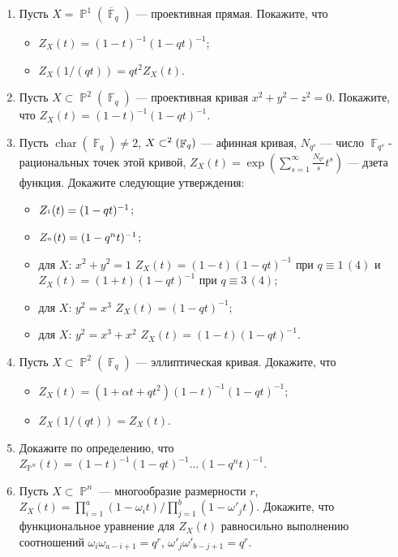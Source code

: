 \documentclass[a4paper, 12pt]{article}
\DeclareMathOperator{\PP}{\mathbb{P}}
\let\AA\relax
\DeclareMathOperator{\AA}{\mathbb{A}}
\DeclareMathOperator{\FF}{\mathbb{F}}
\DeclareMathOperator{\chr}{char}
\begin{document}
\begin{enumerate}[noitemsep,topsep=0pt]
    \item Пусть $X=\PP^1(\overline{\FF}_q)$ --- проективная прямая. Покажите, что
    \begin{itemize}[noitemsep,topsep=0pt]
        \item $Z_X(t)=(1-t)^{-1}(1-qt)^{-1}$;
        \item $Z_X(1/(qt))=qt^2 Z_X(t)$.
    \end{itemize} %
    \item Пусть $X\subset\PP^2(\FF_q)$ --- проективная кривая $x^2+y^2-z^2=0$. Покажите, что $Z_X(t)=(1-t)^{-1}(1-qt)^{-1}$. %
    \item Пусть $\chr(\FF_q)\neq 2$, $X\subset\AA^2(\FF_q)$ --- афинная кривая, $N_{q^s}$ --- число $\FF_{q^s}$- рациональных точек этой кривой, $Z_X(t)=\exp\left(\sum_{s=1}^\infty \frac{N_{q^s}}{s} t^s\right)$ --- дзета функция. Докажите следующие утверждения:
    \begin{itemize}[noitemsep,topsep=0pt]
        \item $Z_{\AA^1}(t)=(1-qt)^{-1}$;
        \item $Z_{\AA^n}(t)=(1-q^nt)^{-1}$;
        \item для $X$: $x^2+y^2=1$ $Z_X(t)=(1-t)(1-qt)^{-1}$ при $q\equiv 1\, (4)$ и $Z_X(t)=(1+t)(1-qt)^{-1}$ при $q\equiv 3\, (4)$;
        \item для $X$: $y^2=x^3$ $Z_X(t)=(1-qt)^{-1}$;
        \item для $X$: $y^2=x^3+x^2$ $Z_X(t)=(1-t)(1-qt)^{-1}$.
    \end{itemize} %
    \item Пусть $X\subset\PP^2(\FF_q)$ --- эллиптическая кривая. Докажите, что 
    \begin{itemize}[noitemsep,topsep=0pt]
        \item $Z_X(t) = (1+\alpha t + qt^2)(1-t)^{-1}(1-qt)^{-1}$;
        \item $Z_X(1/(qt)) = Z_X(t)$.
    \end{itemize} %
    \item Докажите по определению, что $Z_{\PP^n}(t)=(1-t)^{-1} (1-qt)^{-1} \dots (1-q^n t)^{-1}$. %
    \item Пусть $X\subset \PP^n$ --- многообразие размерности $r$, $Z_X(t)=\prod_{i=1}^a (1-\omega_i t) / \prod_{j=1}^b (1-\omega'_j t)$. Докажите, что функциональное уравнение для $Z_X(t)$ равносильно выполнению соотношений $\omega_i \omega_{a-i+1}=q^r$, $\omega'_j \omega'_{b-j+1}=q^r$. %

\end{enumerate}
\end{document}
